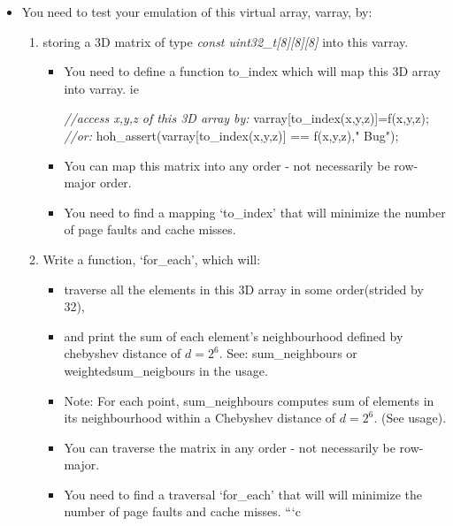 \documentclass[]{book}
\newenvironment{Shaded}{}{}
\newcommand{\StringTok}[1]{\textcolor[rgb]{0.87,0.00,0.00}{{#1}}}
\newcommand{\CommentTok}[1]{\textcolor[rgb]{0.50,0.50,0.50}{\textit{{#1}}}}
\newcommand{\NormalTok}[1]{{#1}}
\begin{document}
\begin{itemize}
\itemsep1pt\parskip0pt
\item
  You need to test your emulation of this virtual array, varray, by:

  \begin{enumerate}
  \def\labelenumi{\arabic{enumi}.}
  \itemsep1pt\parskip0pt
  \item
    storing a 3D matrix of type \emph{const
    uint32\_t{[}8{]}{[}8{]}{[}8{]}} into this varray.

    \begin{itemize}
    \item
      You need to define a function to\_index which will map this 3D
      array into varray. ie

\begin{Shaded}
\begin{Highlighting}[]
\CommentTok{//access x,y,z of this 3D array by:}
\NormalTok{varray[to_index(x,y,z)]=f(x,y,z);}
\CommentTok{//or:}
\NormalTok{hoh_assert(varray[to_index(x,y,z)] == f(x,y,z),}\StringTok{" Bug"}\NormalTok{);}
\end{Highlighting}
\end{Shaded}
    \item
      You can map this matrix into any order - not necessarily be
      row-major order.
    \item
      You need to find a mapping `to\_index' that will minimize the
      number of page faults and cache misses.
    \end{itemize}
  \item
    Write a function, `for\_each', which will:

    \begin{itemize}
    \itemsep1pt\parskip0pt
    \item
      traverse all the elements in this 3D array in some order(strided
      by 32),
    \item
      and print the sum of each element's neighbourhood defined by
      chebyshev distance of \(d=2^6\). See: sum\_neighbours or
      weightedsum\_neigbours in the usage.
    \item
      Note: For each point, sum\_neighbours computes sum of elements in
      its neighbourhood within a Chebyshev distance of \(d=2^6\). (See
      usage).
    \item
      You can traverse the matrix in any order - not necessarily be
      row-major.
    \item
      You need to find a traversal `for\_each' that will will minimize
      the number of page faults and cache misses. ```c
    \end{itemize}
  \end{enumerate}
\end{itemize}
\end{document}
